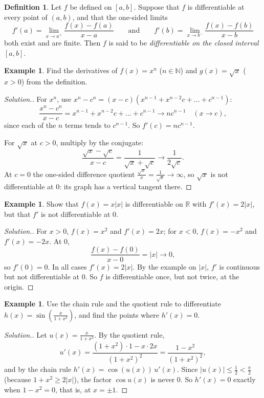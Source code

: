 \documentclass[11pt,a4paper]{article}
\numberwithin{equation}{section}
\theoremstyle{definition}
\newtheorem{defn}[thm]{Definition}
\newtheorem{exa}[thm]{Example}
\newenvironment{solution}
  {\renewcommand{\qedsymbol}{}\begin{proof}[\textit{Solution}.]}
  {\end{proof}}
\begin{document}
\begin{defn}
Let $f$ be defined on $[a,b]$. Suppose that $f$ is differentiable at every point of $(a,b)$, and that the one-sided limits
$$f'(a) = \lim_{x\rightarrow a^+} \frac{f(x) - f(a)}{x - a}\qquad\text{and}\qquad f'(b) = \lim_{x\rightarrow b^-} \frac{f(x) - f(b)}{x - b}$$
both exist and are finite. Then $f$ is said to be \emph{differentiable on the closed interval $[a,b]$}.
\end{defn}

\begin{exa}
Find the derivatives of $f(x) = x^n$ ($n\in\mathbb{N}$) and $g(x) = \sqrt{x}$ ($x>0$) from the definition.
\end{exa}

\begin{solution}
For $x^n$, use $x^n - c^n = (x-c)(x^{n-1} + x^{n-2}c + \dots + c^{n-1})$:
$$\frac{x^n - c^n}{x - c} = x^{n-1} + x^{n-2}c + \dots + c^{n-1}\longrightarrow nc^{n-1}\quad (x\rightarrow c),$$
since each of the $n$ terms tends to $c^{n-1}$. So $f'(c) = nc^{n-1}$.

For $\sqrt{x}$ at $c>0$, multiply by the conjugate:
$$\frac{\sqrt{x} - \sqrt{c}}{x - c} = \frac{1}{\sqrt{x}+\sqrt{c}}\longrightarrow\frac{1}{2\sqrt{c}} .$$
At $c = 0$ the one-sided difference quotient $\frac{\sqrt{x}}{x} = \frac{1}{\sqrt{x}}\longrightarrow\infty$, so $\sqrt{x}$ is not differentiable at $0$: its graph has a vertical tangent there.
\end{solution}

\begin{exa}
Show that $f(x) = x|x|$ is differentiable on $\mathbb{R}$ with $f'(x) = 2|x|$, but that $f'$ is not differentiable at $0$.
\end{exa}

\begin{solution}
For $x>0$, $f(x) = x^2$ and $f'(x) = 2x$; for $x<0$, $f(x) = -x^2$ and $f'(x) = -2x$. At $0$,
$$\frac{f(x) - f(0)}{x - 0} = |x|\longrightarrow0,$$
so $f'(0) = 0$. In all cases $f'(x) = 2|x|$. By the example on $|x|$, $f'$ is continuous but not differentiable at $0$. So $f$ is differentiable once, but not twice, at the origin.
\end{solution}

\begin{exa}
Use the chain rule and the quotient rule to differentiate $h(x) = \sin\left(\frac{x}{1+x^2}\right)$, and find the points where $h'(x) = 0$.
\end{exa}

\begin{solution}
Let $u(x) = \frac{x}{1+x^2}$. By the quotient rule,
$$u'(x) = \frac{(1+x^2)\cdot 1 - x\cdot 2x}{(1+x^2)^2} = \frac{1-x^2}{(1+x^2)^2},$$
and by the chain rule $h'(x) = \cos(u(x))\,u'(x)$. Since $|u(x)|\leq\frac{1}{2}<\frac{\pi}{2}$ (because $1+x^2\geq2|x|$), the factor $\cos u(x)$ is never $0$. So $h'(x) = 0$ exactly when $1 - x^2 = 0$, that is, at $x = \pm1$.
\end{solution}
\end{document}
